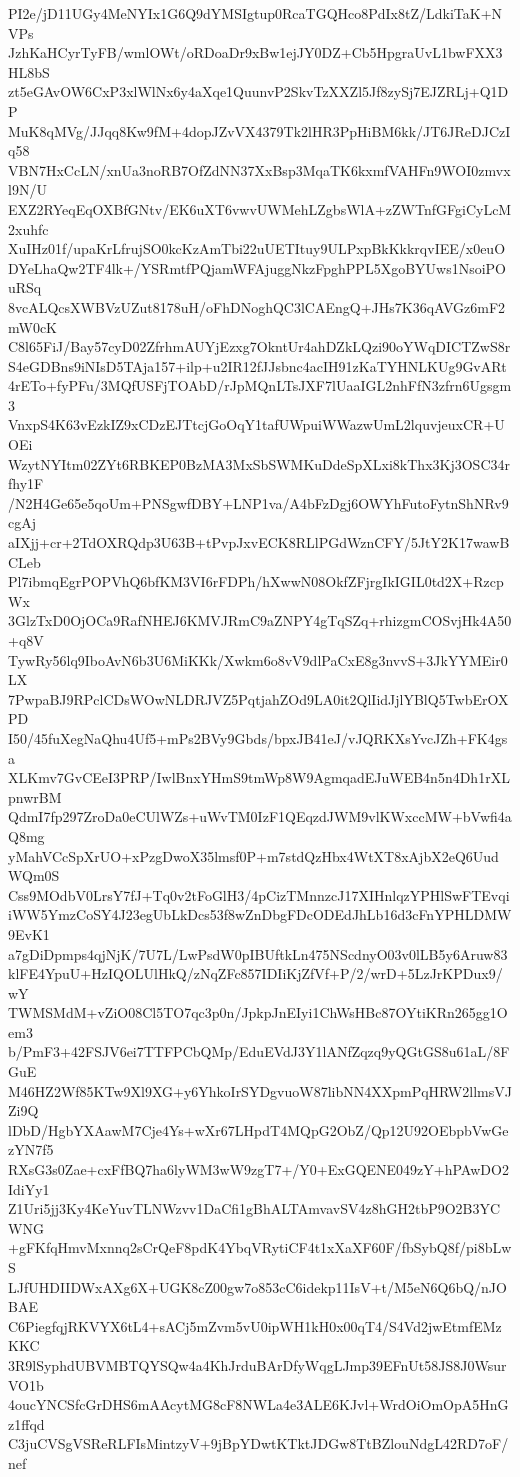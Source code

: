 PI2e/jD11UGy4MeNYIx1G6Q9dYMSIgtup0RcaTGQHco8PdIx8tZ/LdkiTaK+NVPs
JzhKaHCyrTyFB/wmlOWt/oRDoaDr9xBw1ejJY0DZ+Cb5HpgraUvL1bwFXX3HL8bS
zt5eGAvOW6CxP3xlWlNx6y4aXqe1QuunvP2SkvTzXXZl5Jf8zySj7EJZRLj+Q1DP
MuK8qMVg/JJqq8Kw9fM+4dopJZvVX4379Tk2lHR3PpHiBM6kk/JT6JReDJCzIq58
VBN7HxCcLN/xnUa3noRB7OfZdNN37XxBsp3MqaTK6kxmfVAHFn9WOI0zmvxl9N/U
EXZ2RYeqEqOXBfGNtv/EK6uXT6vwvUWMehLZgbsWlA+zZWTnfGFgiCyLcM2xuhfc
XuIHz01f/upaKrLfrujSO0kcKzAmTbi22uUETItuy9ULPxpBkKkkrqvIEE/x0euO
DYeLhaQw2TF4lk+/YSRmtfPQjamWFAjuggNkzFpghPPL5XgoBYUws1NsoiPOuRSq
8vcALQcsXWBVzUZut8178uH/oFhDNoghQC3lCAEngQ+JHs7K36qAVGz6mF2mW0cK
C8l65FiJ/Bay57cyD02ZfrhmAUYjEzxg7OkntUr4ahDZkLQzi90oYWqDICTZwS8r
S4eGDBns9iNIsD5TAja157+ilp+u2IR12fJJsbnc4acIH91zKaTYHNLKUg9GvARt
4rETo+fyPFu/3MQfUSFjTOAbD/rJpMQnLTsJXF7lUaaIGL2nhFfN3zfrn6Ugsgm3
VnxpS4K63vEzkIZ9xCDzEJTtcjGoOqY1tafUWpuiWWazwUmL2lquvjeuxCR+UOEi
WzytNYItm02ZYt6RBKEP0BzMA3MxSbSWMKuDdeSpXLxi8kThx3Kj3OSC34rfhy1F
/N2H4Ge65e5qoUm+PNSgwfDBY+LNP1va/A4bFzDgj6OWYhFutoFytnShNRv9cgAj
aIXjj+cr+2TdOXRQdp3U63B+tPvpJxvECK8RLlPGdWznCFY/5JtY2K17wawBCLeb
Pl7ibmqEgrPOPVhQ6bfKM3VI6rFDPh/hXwwN08OkfZFjrgIkIGIL0td2X+RzcpWx
3GlzTxD0OjOCa9RafNHEJ6KMVJRmC9aZNPY4gTqSZq+rhizgmCOSvjHk4A50+q8V
TywRy56lq9IboAvN6b3U6MiKKk/Xwkm6o8vV9dlPaCxE8g3nvvS+3JkYYMEir0LX
7PwpaBJ9RPclCDsWOwNLDRJVZ5PqtjahZOd9LA0it2QlIidJjlYBlQ5TwbErOXPD
I50/45fuXegNaQhu4Uf5+mPs2BVy9Gbds/bpxJB41eJ/vJQRKXsYvcJZh+FK4gsa
XLKmv7GvCEeI3PRP/IwlBnxYHmS9tmWp8W9AgmqadEJuWEB4n5n4Dh1rXLpnwrBM
QdmI7fp297ZroDa0eCUlWZs+uWvTM0IzF1QEqzdJWM9vlKWxccMW+bVwfi4aQ8mg
yMahVCcSpXrUO+xPzgDwoX35lmsf0P+m7stdQzHbx4WtXT8xAjbX2eQ6UudWQm0S
Css9MOdbV0LrsY7fJ+Tq0v2tFoGlH3/4pCizTMnnzcJ17XIHnlqzYPHlSwFTEvqi
iWW5YmzCoSY4J23egUbLkDcs53f8wZnDbgFDcODEdJhLb16d3cFnYPHLDMW9EvK1
a7gDiDpmps4qjNjK/7U7L/LwPsdW0pIBUftkLn475NScdnyO03v0lLB5y6Aruw83
klFE4YpuU+HzIQOLUlHkQ/zNqZFc857IDIiKjZfVf+P/2/wrD+5LzJrKPDux9/wY
TWMSMdM+vZiO08Cl5TO7qc3p0n/JpkpJnEIyi1ChWsHBc87OYtiKRn265gg1Oem3
b/PmF3+42FSJV6ei7TTFPCbQMp/EduEVdJ3Y1lANfZqzq9yQGtGS8u61aL/8FGuE
M46HZ2Wf85KTw9Xl9XG+y6YhkoIrSYDgvuoW87libNN4XXpmPqHRW2llmsVJZi9Q
lDbD/HgbYXAawM7Cje4Ys+wXr67LHpdT4MQpG2ObZ/Qp12U92OEbpbVwGezYN7f5
RXsG3s0Zae+cxFfBQ7ha6lyWM3wW9zgT7+/Y0+ExGQENE049zY+hPAwDO2IdiYy1
Z1Uri5jj3Ky4KeYuvTLNWzvv1DaCfi1gBhALTAmvavSV4z8hGH2tbP9O2B3YCWNG
+gFKfqHmvMxnnq2sCrQeF8pdK4YbqVRytiCF4t1xXaXF60F/fbSybQ8f/pi8bLwS
LJfUHDIIDWxAXg6X+UGK8cZ00gw7o853cC6idekp11IsV+t/M5eN6Q6bQ/nJOBAE
C6PiegfqjRKVYX6tL4+sACj5mZvm5vU0ipWH1kH0x00qT4/S4Vd2jwEtmfEMzKKC
3R9lSyphdUBVMBTQYSQw4a4KhJrduBArDfyWqgLJmp39EFnUt58JS8J0WsurVO1b
4oucYNCSfcGrDHS6mAAcytMG8cF8NWLa4e3ALE6KJvl+WrdOiOmOpA5HnGz1ffqd
C3juCVSgVSReRLFIsMintzyV+9jBpYDwtKTktJDGw8TtBZlouNdgL42RD7oF/nef
